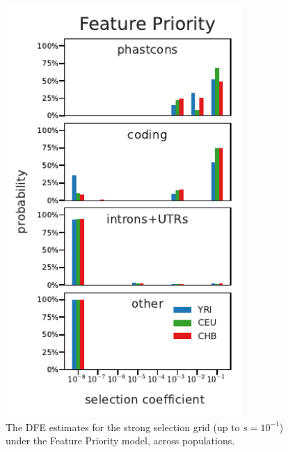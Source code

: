 \documentclass[11pt]{article}
\begin{document}
\begin{figure}[htbp]
  \centering
  \includegraphics[width=0.8\textwidth]{figures/supplementary/feature_priority_pop_dfe_strongselgrid.pdf}

  \caption{The DFE estimates for the strong selection grid (up to $s=10^{-1}$)
  under the Feature Priority model, across populations.}

    \label{suppfig:strong-sel-dfe-pop-phastcons}
\end{figure}
\end{document}
